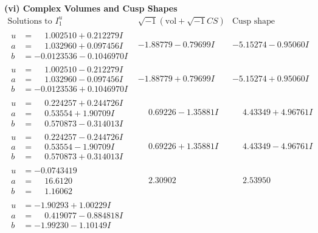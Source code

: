 \documentclass[1p]{elsarticle_modified}
\theoremstyle{definition}
\newcommand{\I}{\sqrt{-1}}
\begin{document}
\newpage\flushleft \textbf{(vi) Complex Volumes and Cusp Shapes}
$$\begin{array}{c|c|c}  
\text{Solutions to }I^u_{1}& \I (\text{vol} + \sqrt{-1}CS) & \text{Cusp shape}\\
 \hline 
\begin{aligned}
u &= \phantom{-}1.002510 + 0.212279 I \\
a &= \phantom{-}1.032960 + 0.097456 I \\
b &= -0.0123536 - 0.1046970 I\end{aligned}
 & -1.88779 - 0.79699 I & -5.15274 - 0.95060 I \\ \hline\begin{aligned}
u &= \phantom{-}1.002510 - 0.212279 I \\
a &= \phantom{-}1.032960 - 0.097456 I \\
b &= -0.0123536 + 0.1046970 I\end{aligned}
 & -1.88779 + 0.79699 I & -5.15274 + 0.95060 I \\ \hline\begin{aligned}
u &= \phantom{-}0.224257 + 0.244726 I \\
a &= \phantom{-}0.53554 + 1.90709 I \\
b &= \phantom{-}0.570873 - 0.314013 I\end{aligned}
 & \phantom{-}0.69226 - 1.35881 I & \phantom{-}4.43349 + 4.96761 I \\ \hline\begin{aligned}
u &= \phantom{-}0.224257 - 0.244726 I \\
a &= \phantom{-}0.53554 - 1.90709 I \\
b &= \phantom{-}0.570873 + 0.314013 I\end{aligned}
 & \phantom{-}0.69226 + 1.35881 I & \phantom{-}4.43349 - 4.96761 I \\ \hline\begin{aligned}
u &= -0.0743419\phantom{ +0.000000I} \\
a &= \phantom{-}16.6120\phantom{ +0.000000I} \\
b &= \phantom{-}1.16062\phantom{ +0.000000I}\end{aligned}
 & \phantom{-}2.30902\phantom{ +0.000000I} & \phantom{-}2.53950\phantom{ +0.000000I} \\ \hline\begin{aligned}
u &= -1.90293 + 1.00229 I \\
a &= \phantom{-}0.419077 - 0.884818 I \\
b &= -1.99230 - 1.10149 I\end{aligned}

\end{array}$$
\end{document}
